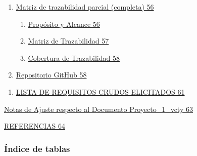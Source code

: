 \documentclass[
]{article}
\begin{document}
\begin{enumerate}
\def\labelenumi{\Alph{enumi}.}
\setcounter{enumi}{3}
\item
  \hyperref[matriz-de-trazabilidad-parcial-completa]{Matriz de
  trazabilidad parcial (completa) 56}

  \begin{enumerate}
  \def\labelenumii{\arabic{enumii}.}
  \item
    \hyperref[_bookmark111]{Propósito y Alcance 56}
  \item
    \hyperref[matriz-de-trazabilidad-1]{Matriz de Trazabilidad 57}
  \item
    \hyperref[_bookmark113]{Cobertura de Trazabilidad 58}
  \end{enumerate}
\item
  \hyperref[repositorio-github]{Repositorio GitHub 58}
\end{enumerate}

\begin{enumerate}
\def\labelenumi{\Roman{enumi}.}
\setcounter{enumi}{2}
\item
  \hyperref[lista-de-requisitos-crudos-elicitados]{LISTA DE REQUISITOS
  CRUDOS ELICITADOS 61}
\end{enumerate}

\hyperref[_bookmark117]{Notas de Ajuste respecto al Documento
Proyecto\_1\_vcty 63}

\hyperref[referencias-1]{REFERENCIAS 64}

\subsubsection{Índice de tablas}\label{uxedndice-de-tablas}
\end{document}
